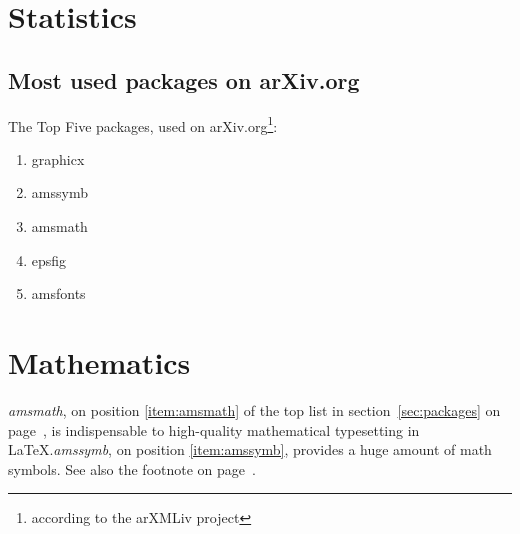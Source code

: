 \documentclass{book}
\begin{document}
\chapter{Statistics}
\blindtext[5]
\section{Most used packages on arXiv.org}\label{sec:packages}
The Top Five packages, used on arXiv.org\footnote{according
to the arXMLiv project\label{fn:project}}:
\begin{enumerate}
\item graphicx
\item amssymb \label{item:amssymb}
\item amsmath \label{item:amsmath}
\item epsfig
\item amsfonts
\end{enumerate}
\chapter{Mathematics}
\emph{amsmath}, on position \ref{item:amsmath} of the top list
in section~\vref{sec:packages} on page~\pageref{sec:packages},
is indispensable to high-quality mathematical typesetting in
\LaTeX.\emph{amssymb}, on position \ref{item:amssymb},
provides a huge amount of math symbols.
See also the footnote on page~.
\end{document}
